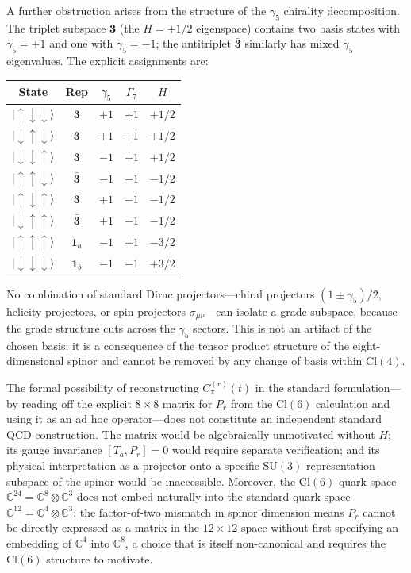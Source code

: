 \documentclass[12pt]{article}
\theoremstyle{definition}
\theoremstyle{remark}
\newcommand{\cl}{\mathrm{Cl}}           %
\newcommand{\su}{\mathrm{SU}}           %
\newcommand{\GaSeven}{\Gamma_7}                      %
\begin{document}
	A further obstruction arises from the structure of the $\gamma_5$ chirality
	decomposition.  The triplet subspace $\mathbf{3}$ (the $H=+1/2$ eigenspace)
	contains two basis states with $\gamma_5=+1$ and one with $\gamma_5=-1$; the
	antitriplet $\bar{\mathbf{3}}$ similarly has mixed $\gamma_5$ eigenvalues.
	The explicit assignments are:
	\begin{center}
		\begin{tabular}{@{}ccccc@{}}
			\toprule
			State & Rep & $\gamma_5$ & $\GaSeven$ & $H$ \\
			\midrule
			$|\!\uparrow\downarrow\downarrow\rangle$
			& $\mathbf{3}$ & $+1$ & $+1$ & $+1/2$ \\
			$|\!\downarrow\uparrow\downarrow\rangle$
			& $\mathbf{3}$ & $+1$ & $+1$ & $+1/2$ \\
			$|\!\downarrow\downarrow\uparrow\rangle$
			& $\mathbf{3}$ & $-1$ & $+1$ & $+1/2$ \\[3pt]
			$|\!\uparrow\uparrow\downarrow\rangle$
			& $\bar{\mathbf{3}}$ & $-1$ & $-1$ & $-1/2$ \\
			$|\!\uparrow\downarrow\uparrow\rangle$
			& $\bar{\mathbf{3}}$ & $+1$ & $-1$ & $-1/2$ \\
			$|\!\downarrow\uparrow\uparrow\rangle$
			& $\bar{\mathbf{3}}$ & $+1$ & $-1$ & $-1/2$ \\[3pt]
			$|\!\uparrow\uparrow\uparrow\rangle$
			& $\mathbf{1}_a$ & $-1$ & $+1$ & $-3/2$ \\
			$|\!\downarrow\downarrow\downarrow\rangle$
			& $\mathbf{1}_b$ & $-1$ & $-1$ & $+3/2$ \\
			\bottomrule
		\end{tabular}
	\end{center}
	No combination of standard Dirac projectors---chiral projectors
	$(1\pm\gamma_5)/2$, helicity projectors, or spin projectors
	$\sigma_{\mu\nu}$---can isolate a grade subspace, because the grade structure
	cuts across the $\gamma_5$ sectors.  This is not an artifact of the chosen
	basis; it is a consequence of the tensor product structure of the
	eight-dimensional spinor and cannot be removed by any change of basis within
	$\cl(4)$.
	
	The formal possibility of reconstructing $C_\pi^{(r)}(t)$ in the standard
	formulation---by reading off the explicit $8\times8$ matrix for $P_r$ from the
	$\cl(6)$ calculation and using it as an ad hoc operator---does not constitute
	an independent standard QCD construction.  The matrix would be algebraically
	unmotivated without $H$; its gauge invariance $[T_a, P_r]=0$ would require
	separate verification; and its physical interpretation as a projector onto a
	specific $\su(3)$ representation subspace of the spinor would be inaccessible.
	Moreover, the $\cl(6)$ quark space
	$\mathbb{C}^{24} = \mathbb{C}^8\otimes\mathbb{C}^3$ does not embed naturally
	into the standard quark space $\mathbb{C}^{12} = \mathbb{C}^4\otimes\mathbb{C}^3$:
	the factor-of-two mismatch in spinor dimension means $P_r$ cannot be directly
	expressed as a matrix in the $12\times12$ space without first specifying an
	embedding of $\mathbb{C}^4$ into $\mathbb{C}^8$, a choice that is itself
	non-canonical and requires the $\cl(6)$ structure to motivate.
	
\end{document}
